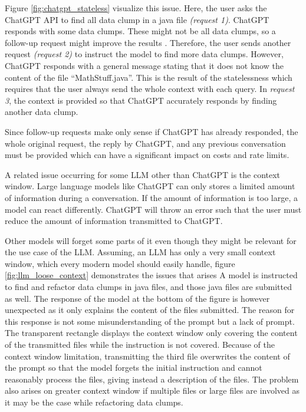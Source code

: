 Figure \ref{fig:chatgpt_stateless} visualize this issue. Here, the user asks the ChatGPT API to find all data clump in a java file \textit{(request 1)}. ChatGPT responds with some data clumps. These might not be all data clumps, so a follow-up request might improve the results \cite{10062688}. Therefore, the user sends another request \textit{(request 2)} to instruct the model to find more data clumps. However, ChatGPT responds with a general message stating that it does not know the content of the file \enquote{MathStuff.java}. This is the result of the statelessness which requires that the user always send the whole context with each query. In \textit{request 3}, the context is provided so that ChatGPT accurately responds by finding another data clump.

Since follow-up requests make only sense if ChatGPT has already responded, the whole original request, the reply by ChatGPT, and any previous conversation must be provided which can have a significant impact on costs and rate limits. 

A related issue occurring for some \acs{LLM} other than ChatGPT is the context window. Large language models like ChatGPT can only stores a limited amount of information during a conversation. If the amount of information is too large,  a model can react differently. ChatGPT will throw an error such that the user must reduce the amount of information transmitted to ChatGPT.

Other models will forget some parts of it even though they might be relevant for the use case of the \ac{LLM}.
Assuming, an \ac{LLM} has only a very small context window, which every modern model should easily handle, figure \ref{fig:llm_loose_context} demonstrates the issues that arises  A model is instructed to find and refactor data clumps in java files, and those java files are submitted as well. The response of the model at the bottom of the figure is however unexpected as it only explains the content of the files submitted. The reason for this response is not some misunderstanding of the prompt but a lack of prompt. The transparent rectangle displays the context window only covering the content of the transmitted files while the instruction is not covered. 
Because of the context window limitation, transmitting the third file overwrites the content of the prompt so that the model forgets the initial instruction and cannot reasonably process the files, giving instead a description of the files. The problem also arises on greater context window if multiple files or large files are involved as it may be the case while refactoring data clumps.

